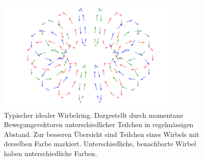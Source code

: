 \begin{figure}
\centering
\includegraphics[width=0.8\textwidth]{papers/wirbelringe/fig/wirbelring_RGB.pdf}
\caption{Typischer idealer Wirbelring. 
Dargestellt durch momentane Bewegungsvektoren unterschiedlicher Teilchen in regelmässigen Abstand. 
Zur besseren Übersicht sind Teilchen eines Wirbels mit derselben Farbe markiert. 
Unterschiedliche, benachbarte Wirbel haben unterschiedliche Farben. \label{Wirbelringe:fig:generell}}
\end{figure}